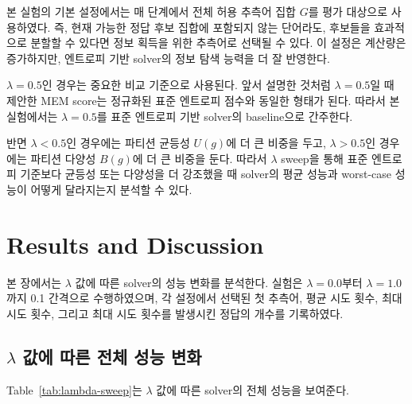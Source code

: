 \documentclass[11pt]{article}
\begin{document}
본 실험의 기본 설정에서는 매 단계에서 전체 허용 추측어 집합 $G$를 평가 대상으로 사용하였다.
즉, 현재 가능한 정답 후보 집합에 포함되지 않는 단어라도, 후보들을 효과적으로 분할할 수 있다면 정보 획득을 위한 추측어로 선택될 수 있다.
이 설정은 계산량은 증가하지만, 엔트로피 기반 solver의 정보 탐색 능력을 더 잘 반영한다.

$\lambda = 0.5$인 경우는 중요한 비교 기준으로 사용된다.
앞서 설명한 것처럼 $\lambda = 0.5$일 때 제안한 MEM score는 정규화된 표준 엔트로피 점수와 동일한 형태가 된다.
따라서 본 실험에서는 $\lambda = 0.5$를 표준 엔트로피 기반 solver의 baseline으로 간주한다.

반면 $\lambda < 0.5$인 경우에는 파티션 균등성 $U(g)$에 더 큰 비중을 두고, $\lambda > 0.5$인 경우에는 파티션 다양성 $B(g)$에 더 큰 비중을 둔다.
따라서 $\lambda$ sweep을 통해 표준 엔트로피 기준보다 균등성 또는 다양성을 더 강조했을 때 solver의 평균 성능과 worst-case 성능이 어떻게 달라지는지 분석할 수 있다.
















\section{Results and Discussion}
\label{sec:results}

본 장에서는 $\lambda$ 값에 따른 solver의 성능 변화를 분석한다.
실험은 $\lambda = 0.0$부터 $\lambda = 1.0$까지 0.1 간격으로 수행하였으며,
각 설정에서 선택된 첫 추측어, 평균 시도 횟수, 최대 시도 횟수,
그리고 최대 시도 횟수를 발생시킨 정답의 개수를 기록하였다.

\subsection{\texorpdfstring{$\lambda$}{lambda} 값에 따른 전체 성능 변화}

Table~\ref{tab:lambda-sweep}는 $\lambda$ 값에 따른 solver의 전체 성능을 보여준다.
\end{document}
